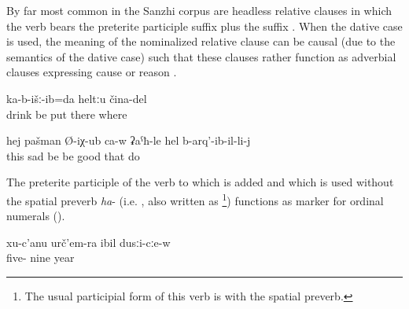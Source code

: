 By far most common in the Sanzhi corpus are headless relative clauses in which the verb bears the preterite participle suffix plus the suffix  . When the dative case is used, the meaning of the nominalized relative clause can be causal (due to the semantics of the dative case) such that these clauses rather function as adverbial clauses expressing cause or reason .
%
\begin{exe}
	\ex	\label{ex:‎the one where they are sitting and drinking, I put this (picture) somewhere}
	\gll	[b-učː-ul	ka-b-iž-ib-il]	ka-b-išː-ib=da	heltːu	čina-del\\
		drink	be	put	there	where\\
	\glt	{}
\end{exe}
%
\begin{exe}	
	\ex	\label{ex:He became sad, in my opinion, he got very sad, because of what he did minor}
	\gll	hej	pašman	Ø-iχ-ub	ca-w	ʡaˁħ-le	hel	b-arq'-ib-il-li-j	\\
		this	sad	be	be	good	that	do\\
	\glt	{}

\end{exe}

The preterite participle of the verb  to which  is added and which is used without the spatial preverb \textit{ha}- (i.e. , also written as \footnote{The usual participial form of this verb is  with the spatial preverb.}) functions as marker for ordinal numerals  ().
%
\begin{exe}
	\ex	\label{ex:in the year (19)59}
	\gll	xu-c'anu	urč'em-ra	ibil	dusːi-cːe-w\\
		five-	nine		year\\
	\glt	{}
\end{exe}

